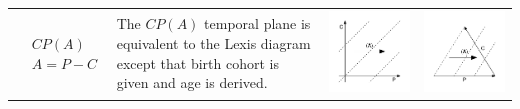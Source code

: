 \documentclass[11pt,oneside,a4paper]{article} %
\begin{document}
\begin{center}
\begin{longtable}{m{}m{}m{}m{}}
  \midrule
  $$\begin{aligned}
    &CP(A) \\
    &A = P - C
  \end{aligned}$$ &
  The $CP(A)$ temporal plane is equivalent to the Lexis diagram except that
  birth cohort is given and age is derived. &
  \includegraphics[width = \linewidth]{Figures/JonasTable/CPa.pdf} & \includegraphics[width = \linewidth]{Figures/JonasTable/CPa_iso.pdf}  \\

\end{longtable}
\end{center}
\end{document}
